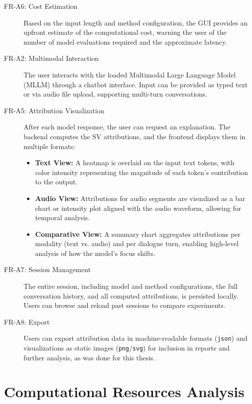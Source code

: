 \begin{appendices}
\begin{description}
        \item[FR-A6: Cost Estimation] Based on the input length and method configuration, the GUI provides an upfront estimate of the computational cost, warning the user of the number of model evaluations required and the approximate latency.

        \item[FR-A2: Multimodal Interaction] The user interacts with the loaded Multimodal Large Language Model (MLLM) through a chatbot interface. Input can be provided as typed text or via audio file upload, supporting multi-turn conversations.

        \item[FR-A5: Attribution Visualization] After each model response, the user can request an explanation. The backend computes the SV attributions, and the frontend displays them in multiple formats:     \begin{itemize}

        \item \textbf{Text View:} A heatmap is overlaid on the input text tokens, with color intensity representing the magnitude of each token's contribution to the output.

        \item \textbf{Audio View:} Attributions for audio segments are visualized as a bar chart or intensity plot aligned with the audio waveform, allowing for temporal analysis.

        \item \textbf{Comparative View:} A summary chart aggregates attributions per modality (text vs. audio) and per dialogue turn, enabling high-level analysis of how the model's focus shifts.     \end{itemize}

        \item[FR-A7: Session Management] The entire session, including model and method configurations, the full conversation history, and all computed attributions, is persisted locally. Users can browse and reload past sessions to compare experiments.
        \item[FR-A8: Export] Users can export attribution data in machine-readable formats (\texttt{json}) and visualizations as static images (\texttt{png}/\texttt{svg}) for inclusion in reports and further analysis, as was done for this thesis.
    \end{description}


    \chapter{Computational Resources Analysis}
    \label{app:compute_analysis}


\end{appendices}
